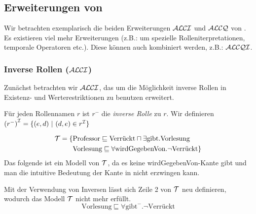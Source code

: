 \subsection{Erweiterungen von \texorpdfstring{\ALC}{ALC}}\label{erweiterungen-von-alc}

Wir betrachten exemplarisch die beiden Erweiterungen $\mathcal{A}\mathcal{L}\mathcal{C}\mathcal{I}$ und $\mathcal{A}\mathcal{L}\mathcal{C}\mathcal{Q}$ von \ALC. Es existieren viel mehr Erweiterungen (z.B.: um spezielle Rolleniterpretationen, temporale Operatoren etc.). Diese können auch kombiniert werden, z.B.: $\mathcal{A}\mathcal{L}\mathcal{C}\mathcal{Q}\mathcal{I}$.

\subsubsection{Inverse Rollen (\texorpdfstring{$\mathcal{A}\mathcal{L}\mathcal{C}\mathcal{I}$}{ALCI})}\label{inverse-rollen-alci}

Zunächst betrachten wir $\mathcal{A}\mathcal{L}\mathcal{C}\mathcal{I}$, das \ALC um die Möglichkeit inverse Rollen in Existenz- und Werterestriktionen zu benutzen erweitert.

\begin{definition}
Für jeden Rollennamen $r$ ist $r^{-}$ die \emph{inverse
Rolle} zu $r$. Wir definieren
$\left( r^{-} \right)^\MI = \left\{ \left( e,d \right)\  \right|\ \left( d,e \right) \in r^\MI\}$
\end{definition}

\begin{tafel}
    \begin{align*}
        \mathcal{T} = \{& \text{Professor} \sqsubseteq \text{Verrückt} \sqcap \exists  \text{gibt}.\text{Vorlesung}\\
                & \text{Vorlesung} \sqsubseteq \forall \text{wirdGegebenVon}.\neg\text{Verrückt}\}
    \end{align*}
    Das folgende ist ein Modell von $\mathcal{T}$, da es keine wirdGegebenVon-Kante gibt und man die intuitive Bedeutung der Kante in \ALC nicht erzwingen kann.
    \begin{center}
    \end{center}
    Mit der Verwendung von Inversen lässt sich Zeile 2 von $\mathcal{T}$ neu definieren, wodurch das Modell $\mathcal{T}$ nicht mehr erfüllt.
    \[ \text{Vorlesung} \sqsubseteq \forall \text{gibt}^-.\neg\text{Verrückt} \]
\end{tafel}

